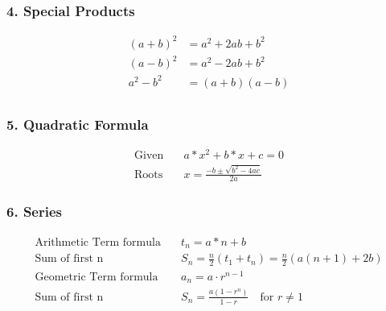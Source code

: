 \documentclass[twocolumn,a4]{article}
\begin{document}
\subsubsection*{4. Special Products}
\begin{align*}
(a + b)^2 &= a^2 + 2ab + b^2 \\ 
(a - b)^2 &= a^2 - 2ab + b^2 \\
a^2 - b^2 &= (a + b)(a - b) \\
\end{align*}

\subsubsection*{5. Quadratic Formula}
\begin{align*}
\text{Given} \quad & a * x^2 + b * x + c = 0 \\
\text{Roots} \quad & x = \frac{-b \pm \sqrt{b^2 - 4ac}}{2a}
\end{align*}

\subsubsection*{6. Series}
\begin{align*}
\text{Arithmetic Term formula} \quad & t_n = a * n + b\\
\text{Sum of first n} \quad & S_n = \frac{n}{2} ( t_1 + t_n )  = \frac{n}{2} \left(a(n + 1) + 2b\right) \\
\text{Geometric Term formula} \quad & a_n = a \cdot r^{n-1} \\
\text{Sum of first n} \quad & S_n = \frac{a(1 - r^n)}{1 - r} \quad \text{for } r \neq 1 \\
\end{align*}
\end{document}
